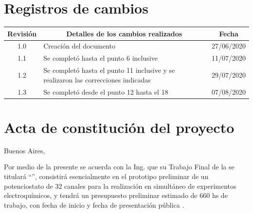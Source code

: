 \documentclass[11pt]{charter}
\begin{document}
\maketitle
\thispagestyle{empty}
\pagebreak


\thispagestyle{empty}
{\setlength{\parskip}{0pt}
\tableofcontents{}
}
\pagebreak


\section{Registros de cambios}
\label{sec:registro}


\begin{table}[ht]
\label{tab:registro}
\centering

\begin{tabularx}{\linewidth}{@{}|c|X|c|@{}}
\hline
\rowcolor[HTML]{C0C0C0} 
Revisión & \multicolumn{1}{c|}{\cellcolor[HTML]{C0C0C0}Detalles de los cambios realizados} & Fecha      \\ \hline
1.0      & Creación del documento     & 27/06/2020 \\ \hline
1.1      & Se completó hasta el punto 6 inclusive  & 11/07/2020  \\ \hline
1.2      & Se completó hasta el punto 11 inclusive y se realizaron las correcciones indicadas                  & 29/07/2020\\ \hline
1.3      & Se completó desde el punto 12 hasta el 18   & 07/08/2020\\ \hline
\end{tabularx}
\end{table}

\pagebreak



\section{Acta de constitución del proyecto}
\label{sec:acta}

\begin{flushright}
Buenos Aires, \fechaInicioName
\end{flushright}

\vspace{2cm}

Por medio de la presente se acuerda con la Ing. \authorname\hspace{1px} que su Trabajo Final de la \degreename\hspace{1px} se titulará ``\ttitle'', consistirá esencialmente en el prototipo preliminar de un potenciostato de 32 canales para la realización en simultáneo de experimentos electroquímicos, y tendrá un presupuesto preliminar estimado de 660 hs de trabajo, con fecha de inicio \fechaInicioName\hspace{1px} y fecha de presentación pública \fechaFinalName.
\end{document}
